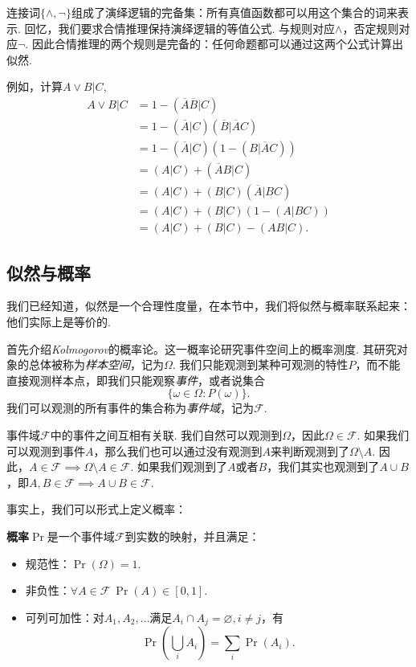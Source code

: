 连接词$\{\wedge,\neg\}$组成了演绎逻辑的完备集：所有真值函数都可以用这个集合的词来表示. 回忆，我们要求合情推理保持演绎逻辑的等值公式. 与规则对应$\wedge$，否定规则对应$\neg$. 因此合情推理的两个规则是完备的：任何命题都可以通过这两个公式计算出似然.

\begin{example}
    例如，计算$A\vee B|C$,
    \begin{align*}
        A \vee B|C 
        &= 1 - (\overline{A}\overline{B}|C)\\
        & = 1 - (\overline{A}|C)(\overline{B}|\overline{A}C) \\
        &= 1 - (\overline{A}|C)(1 - (B|\overline{A}C))\\
        &= (A|C) + (\overline{A}B|C) \\
        &= (A|C) + (B|C)(\overline{A}|BC) \\
        &= (A|C) + (B|C)(1 - (A|BC)) \\
        &= (A|C) + (B|C) - (AB|C).
    \end{align*}
\end{example}


\subsection{似然与概率}
我们已经知道，似然是一个合理性度量，在本节中，我们将似然与概率联系起来：他们实际上是等价的.

首先介绍\emph{Kolmogorov}的概率论。这一概率论研究事件空间上的概率测度. 其研究对象的总体被称为\emph{样本空间}，记为$\Omega$. 我们只能观测到某种可观测的特性$P$，而不能直接观测样本点，即我们只能观察\emph{事件}，或者说集合
    \[\{\omega\in \Omega:P(\omega)\}.\]
我们可以观测的所有事件的集合称为\emph{事件域}，记为$\mathscr{F}$.

事件域$\mathscr{F}$中的事件之间互相有关联. 我们自然可以观测到$\Omega$，因此$\Omega\in\mathscr{F}$. 如果我们可以观测到事件$A$，那么我们也可以通过没有观测到$A$来判断观测到了$\Omega\setminus A$. 因此，$A\in\mathscr{F}\implies \Omega\setminus A\in\mathscr{F}$. 如果我们观测到了$A$或者$B$，我们其实也观测到了$A\cup B$，即$A,B\in\mathscr{F}\implies A\cup B\in\mathscr{F}$.

事实上，我们可以形式上定义概率：
\begin{definition}[概率]
\textbf{概率}$\Pr$是一个事件域$\mathscr{F}$到实数的映射，并且满足：
    \begin{itemize}
        \item 规范性：$\Pr(\Omega)=1$.
        \item 非负性：$\forall A\in\mathscr{F}~\Pr(A)\in[0,1]$.
        \item 可列可加性：对$A_1,A_2,\dots$满足$A_i\cap A_j=\varnothing,i\neq j$，有
        \[\Pr\left(\bigcup_i A_i\right)=\sum_i \Pr(A_i).\]
    \end{itemize}
\end{definition}

